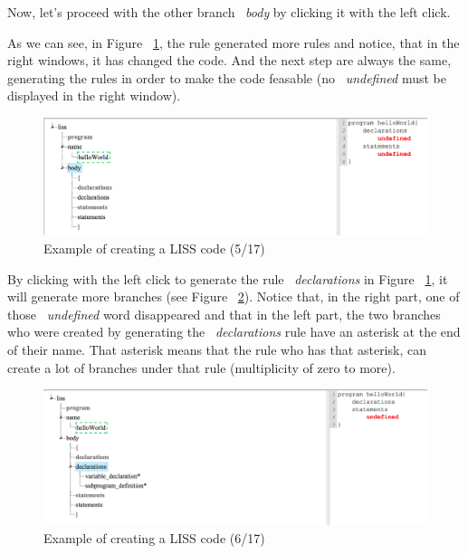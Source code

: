 \documentclass[
  oneside,
  11pt, a4paper,
  footinclude=true,
  headinclude=true,
  cleardoublepage=empty
]{scrbook}
\begin{document}
Now, let's proceed with the other branch ~\textit{body} by clicking it with the left click. 

As we can see, in Figure ~\ref{fig:LISS-SDE_example_5}, the rule generated more rules and notice, that in the right windows, it has changed the code.  And the next step are always the same, generating the rules in order to make the code feasable (no ~\textit{undefined} must be displayed in the right window).

\begin{figure}[h!]
  \centering
    \includegraphics[width=1\textwidth]{img/LISS-SDE_creating_program/LISS-SDE5.png}
    \caption{Example of creating a LISS code (5/17)}
    \label{fig:LISS-SDE_example_5}
\end{figure}

By clicking with the left click to generate the rule ~\textit{declarations} in Figure ~\ref{fig:LISS-SDE_example_5}, it will generate more branches (see Figure ~\ref{fig:LISS-SDE_example_6}). Notice that, in the right part, one of those ~\textit{undefined} word disappeared and that in the left part, the two branches who were created by generating the ~\textit{declarations} rule have an asterisk at the end of their name. That asterisk means that the rule who has that asterisk, can create a lot of branches under that rule (multiplicity of zero to more).

\begin{figure}[h!]
  \centering
    \includegraphics[width=1\textwidth]{img/LISS-SDE_creating_program/LISS-SDE6.png}
    \caption{Example of creating a LISS code (6/17)}
    \label{fig:LISS-SDE_example_6}
\end{figure}
\end{document}
